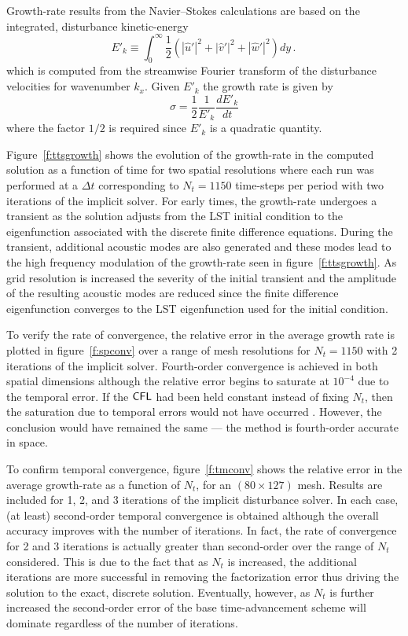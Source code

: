 Growth-rate results from the Navier--Stokes calculations are based on the
integrated, disturbance kinetic-energy
%
\begin{equation}
  E'_k \equiv \int_0^\infty \frac{1}{2} \left( |\hat u'|^2 + |\hat v'|^2 + 
                                               |\hat w'|^2 \right) dy \period
\end{equation}
%
which is computed from the streamwise Fourier transform of the disturbance
velocities for wavenumber $k_x$.  Given $E'_k$ the growth rate is given by
%
\begin{equation}
  \sigma = \frac{1}{2} \frac{1}{E'_k} \frac{dE'_k}{dt}
\end{equation}
%
where the factor $1/2$ is required since $E'_k$ is a quadratic quantity.

Figure~\ref{f:ttsgrowth} shows the evolution of the growth-rate in the
computed solution as a function of time for two spatial resolutions where each
run was performed at a $\Delta t$ corresponding to $N_t=1150$ time-steps per
period with two iterations of the implicit solver.  For early times, the
growth-rate undergoes a transient as the solution adjusts from the LST initial
condition to the eigenfunction associated with the discrete finite difference
equations. During the transient, additional acoustic modes are also generated
and these modes lead to the high frequency modulation of the growth-rate seen
in figure~\ref{f:ttsgrowth}.  As grid resolution is increased the severity of
the initial transient and the amplitude of the resulting acoustic modes are
reduced since the finite difference eigenfunction converges to the LST
eigenfunction used for the initial condition.

To verify the rate of convergence, the relative error in the average growth
rate is plotted in figure~\ref{f:spconv} over a range of mesh resolutions for
$N_t=1150$ with 2 iterations of the implicit solver.  Fourth-order convergence
is achieved in both spatial dimensions although the relative error begins to
saturate at $10^{-4}$ due to the temporal error. If the ${\sf CFL}$ had been held
constant instead of fixing $N_t$, then the saturation due to temporal errors
would not have occurred \cite{KiMo:85}.  However, the conclusion would have
remained the same --- the method is fourth-order accurate in space.

To confirm temporal convergence, figure~\ref{f:tmconv} shows the relative
error in the average growth-rate as a function of $N_t$, for an $(80 \times
127)$ mesh. Results are included for 1, 2, and 3 iterations of the implicit
disturbance solver.  In each case, (at least) second-order temporal
convergence is obtained although the overall accuracy improves with the number
of iterations.  In fact, the rate of convergence for 2 and 3 iterations is
actually greater than second-order over the range of $N_t$ considered. This is
due to the fact that as $N_t$ is increased, the additional iterations are more
successful in removing the factorization error thus driving the solution to
the exact, discrete solution.  Eventually, however, as $N_t$ is further
increased the second-order error of the base time-advancement scheme will
dominate regardless of the number of iterations.

